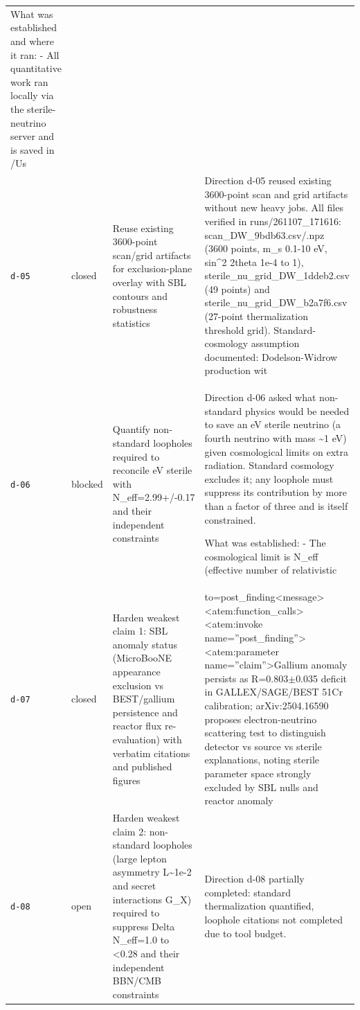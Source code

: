 \documentclass[11pt,a4paper]{article}
\begin{document}
\begin{longtable}{@{}p{}p{}p{}p{}@{}}
What was established and where it ran:
- All quantitative work ran locally via the sterile-neutrino server and is saved in /Us \\
\texttt{d-05} & closed & Reuse existing 3600-point scan/grid artifacts for exclusion-plane overlay with SBL contours and robustness statistics & Direction d-05 reused existing 3600-point scan and grid artifacts without new heavy jobs. All files verified in runs/261107\_171616: scan\_DW\_9bdb63.csv/.npz (3600 points, m\_s 0.1-10 eV, sin\textasciicircum{}2 2theta 1e-4 to 1), sterile\_nu\_grid\_DW\_1ddeb2.csv (49 points) and sterile\_nu\_grid\_DW\_b2a7f6.csv (27-point thermalization threshold grid). Standard-cosmology assumption documented: Dodelson-Widrow production wit \\
\texttt{d-06} & blocked & Quantify non-standard loopholes required to reconcile eV sterile with N\_eff=2.99+/-0.17 and their independent constraints & Direction d-06 asked what non-standard physics would be needed to save an eV sterile neutrino (a fourth neutrino with mass \textasciitilde{}1 eV) given cosmological limits on extra radiation. Standard cosmology excludes it; any loophole must suppress its contribution by more than a factor of three and is itself constrained.

What was established:
- The cosmological limit is N\_eff (effective number of relativistic \\
\texttt{d-07} & closed & Harden weakest claim 1: SBL anomaly status (MicroBooNE appearance exclusion vs BEST/gallium persistence and reactor flux re-evaluation) with verbatim citations and published figures & to=post\_finding\textless{}\textbar{}message\textbar{}\textgreater{}\textless{}atem:function\_calls\textgreater{}
\textless{}atem:invoke name=''post\_finding''\textgreater{}
\textless{}atem:parameter name=''claim''\textgreater{}Gallium anomaly persists as R=0.803$\pm$0.035 deficit in GALLEX/SAGE/BEST 51Cr calibration; arXiv:2504.16590 proposes electron-neutrino scattering test to distinguish detector vs source vs sterile explanations, noting sterile parameter space strongly excluded by SBL nulls and reactor anomaly  \\
\texttt{d-08} & open & Harden weakest claim 2: non-standard loopholes (large lepton asymmetry L\textasciitilde{}1e-2 and secret interactions G\_X) required to suppress Delta N\_eff=1.0 to \textless{}0.28 and their independent BBN/CMB constraints & Direction d-08 partially completed: standard thermalization quantified, loophole citations not completed due to tool budget.


\end{longtable}
\end{document}
